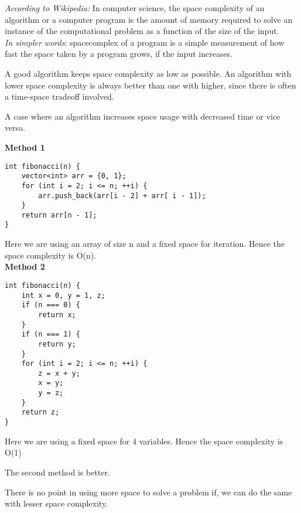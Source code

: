 
\textit{According to Wikipedia:} In computer science, the space complexity of an algorithm or a computer program is the amount of memory required to solve an instance of the computational problem as a function of the size of the input.\\

\textit{In simpler words}: \gls{spacecomplex} of a program is a simple measurement of how fast the space taken by a program grows, if the input increases. 


A good algorithm keeps space complexity as low as possible. An algorithm with lower space complexity is always better than one with higher, since there is often a time-space tradeoff involved. 

A case where an algorithm increases space usage with decreased time or vice versa.

\hypertarget{1cb3}{\label{1cb3}}

\textbf{Method 1}

\begin{verbatim}
int fibonacci(n) {
    vector<int> arr = {0, 1};
    for (int i = 2; i <= n; ++i) {
        arr.push_back(arr[i - 2] + arr[ i - 1]);
    }
    return arr[n - 1];
}
\end{verbatim}

Here we are using an array of size n and a fixed space for iteration.
Hence the space complexity is O(n).\\

\textbf{Method 2}

\begin{verbatim}
int fibonacci(n) {
    int x = 0, y = 1, z;
    if (n === 0) {
        return x;
    }
    if (n === 1) {
        return y;
    }
    for (int i = 2; i <= n; ++i) {
        z = x + y;
        x = y;
        y = z;
    }
    return z;
}
\end{verbatim}

Here we are using a fixed space for 4 variables. Hence the space
complexity is O(1)

\hypertarget{5a92}{\label{5a92}}

The second method is better.

There is no point in using more space to solve a problem if, we can do
the same with lesser space complexity.


